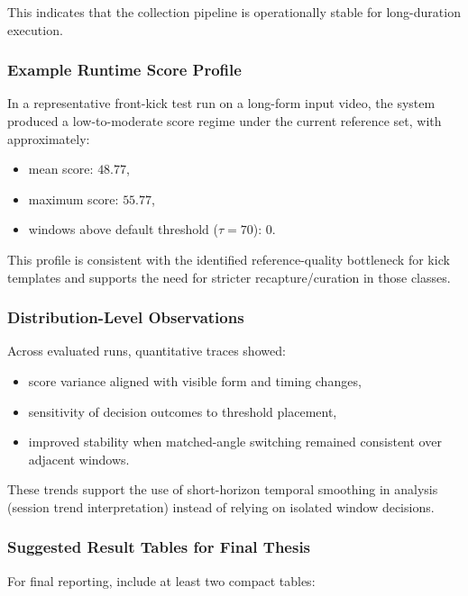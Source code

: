 \documentclass[12pt]{article}
\begin{document}
{This indicates that the collection pipeline is operationally stable for long-duration execution.

\subsubsection{Example Runtime Score Profile}

In a representative front-kick test run on a long-form input video, the system produced a low-to-moderate score regime under the current reference set, with approximately:

\begin{itemize}
    \item mean score: \(48.77\),
    \item maximum score: \(55.77\),
    \item windows above default threshold (\(\tau=70\)): \(0\).
\end{itemize}

This profile is consistent with the identified reference-quality bottleneck for kick templates and supports the need for stricter recapture/curation in those classes.

\subsubsection{Distribution-Level Observations}

Across evaluated runs, quantitative traces showed:

\begin{itemize}
    \item score variance aligned with visible form and timing changes,
    \item sensitivity of decision outcomes to threshold placement,
    \item improved stability when matched-angle switching remained consistent over adjacent windows.
\end{itemize}

These trends support the use of short-horizon temporal smoothing in analysis (session trend interpretation) instead of relying on isolated window decisions.

\subsubsection{Suggested Result Tables for Final Thesis}

For final reporting, include at least two compact tables:

}
\end{document}
